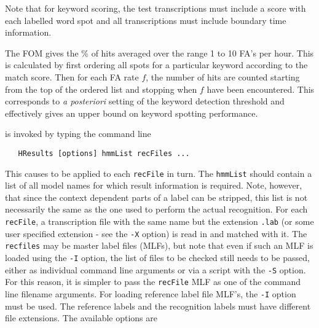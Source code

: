 Note that for keyword scoring, the test
transcriptions must include a score with each labelled word spot
and all transcriptions must include boundary time information.

The FOM gives the \% of hits
averaged over the range 1 to 10 FA's per hour.  This is calculated
by first ordering all spots for a particular keyword according to
the match score.  Then for each FA rate $f$, the number of hits are counted
starting from the top of the ordered list and stopping when 
$f$ have been encountered.  This corresponds to \textit{a posteriori}
setting of the keyword detection threshold and effectively gives an
upper bound on keyword spotting performance.


 is invoked by typing the command line
\begin{verbatim}
   HResults [options] hmmList recFiles ...
\end{verbatim}
This causes  to be applied to each {\tt recFile} in turn.  The
{\tt hmmList} should contain a list of all model names for which result
information is required.  Note, however, that since the context dependent parts
of a label can be stripped, this list is not necessarily the same as the one
used to perform the actual recognition.  For each {\tt recFile}, a
transcription file with the same name but the extension {\tt .lab} (or some
user specified extension - see the {\tt -X} option) is read in and matched with
it. The {\tt recfiles} may be master label files (MLFs), but note that even if  such an MLF is loaded using the {\tt -I} option, the list of files to be checked still needs to be passed, either as individual command line arguments or via a script with the {\tt -S} option. For this reason, it is simpler to pass the {\tt recFile} MLF as one of the command line filename arguments. For loading reference label file MLF's, the {\tt -I} option must be used. The reference labels and the recognition labels must have different file extensions.
The available options are
